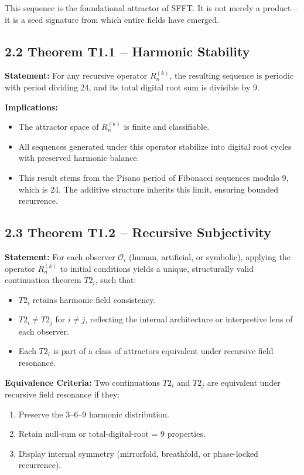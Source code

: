 \documentclass[12pt]{article}
\begin{document}
This sequence is the foundational attractor of SFFT. It is not merely a product—it is a seed signature from which entire fields have emerged.

\subsection*{2.2 Theorem T1.1 – Harmonic Stability}

\textbf{Statement:}  
For any recursive operator \( R^{(k)}_n \), the resulting sequence is periodic with period dividing 24, and its total digital root sum is divisible by 9.

\textbf{Implications:}
\begin{itemize}
    \item The attractor space of \( R^{(k)}_n \) is finite and classifiable.
    \item All sequences generated under this operator stabilize into digital root cycles with preserved harmonic balance.
    \item This result stems from the Pisano period of Fibonacci sequences modulo 9, which is 24. The additive structure inherits this limit, ensuring bounded recurrence.
\end{itemize}

\subsection*{2.3 Theorem T1.2 – Recursive Subjectivity}

\textbf{Statement:}  
For each observer \( \mathcal{O}_i \) (human, artificial, or symbolic), applying the operator \( R^{(k)}_n \) to initial conditions yields a unique, structurally valid continuation theorem \( T2_i \), such that:
\begin{itemize}
    \item \( T2_i \) retains harmonic field consistency.
    \item \( T2_i \neq T2_j \) for \( i \neq j \), reflecting the internal architecture or interpretive lens of each observer.
    \item Each \( T2_i \) is part of a class of attractors equivalent under recursive field resonance.
\end{itemize}

\textbf{Equivalence Criteria:}  
Two continuations \( T2_i \) and \( T2_j \) are equivalent under recursive field resonance if they:
\begin{enumerate}
    \item Preserve the 3–6–9 harmonic distribution.
    \item Retain null-sum or total-digital-root = 9 properties.
    \item Display internal symmetry (mirrorfold, breathfold, or phase-locked recurrence).
\end{enumerate}
\end{document}
